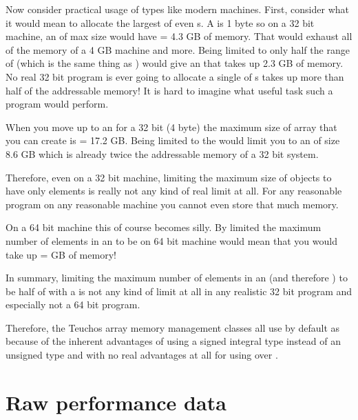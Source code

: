 \documentclass[pdf,ps2pdf,11pt]{SANDreport}
\begin{document}
Now consider practical usage of types like {} modern
machines.  First, consider what it would mean to allocate the largest
{} of even {}s.  A {} is 1 byte
so on a 32 bit machine, an {} of max size would
have {} = 4.3 GB of memory.  That would exhaust
all of the memory of a 4 GB machine and more.  Being limited to only
half the range of {} (which is the same thing as
{}) would give an {} that takes
up 2.3 GB of memory.  No real 32 bit program is ever going to allocate
a single {} of {}s takes up more than half
of the addressable memory!  It is hard to imagine what useful task
such a program would perform.

When you move up to an {} for a 32 bit (4 byte)
{} the maximum size of array that you can create is
{} = 17.2 GB.  Being limited to the
{} {} would limit you to an
{} of size 8.6 GB which is already twice the
addressable memory of a 32 bit system.

Therefore, even on a 32 bit machine, limiting the maximum size of
{} objects to have only
{} elements is really
not any kind of real limit at all.  For any reasonable program on any
reasonable machine you cannot even store that much memory.

On a 64 bit machine this of course becomes silly.  By limited the
maximum number of elements in an {} to be
{} on 64 bit machine
would mean that you would take up {} = {} GB of memory!

In summary, limiting the maximum number of elements in an
{} (and therefore {}) to be half
of {} with a {} {} is
not any kind of limit at all in any realistic 32 bit program and
especially not a 64 bit program.

Therefore, the Teuchos array memory management classes all use by
default {} as {} because of the
inherent advantages of using a signed integral type instead of an
unsigned type and with no real advantages at all for using
{} over {}.


%
{}\section{Raw performance data}
\label{apdx:raw-perf-data}
%
\end{document}

